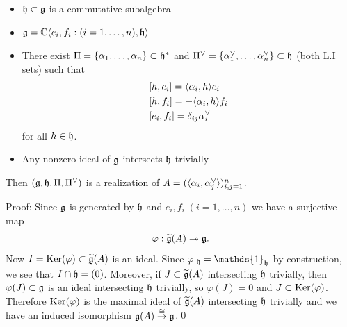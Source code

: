 \begin{itemize}
\begin{dang}
\begin{lemma}
\begin{itemize}
            \item $\mathfrak{h}\subset\mathfrak{g}$ is a commutative subalgebra
            \item $\mathfrak{g} =\mathbb{C}\langle e_i, f_i: (i=1,\dots,n), \mathfrak{h}\rangle$ 
            \item There exist $\Pi = \{\alpha_1,\dots,\alpha_n\}\subset\mathfrak{h}^*$ and 
            $\Pi^\vee=\{\alpha^{\vee}_1,\dots,\alpha^{\vee}_n\}\subset\mathfrak{h}$ (both L.I sets) such that 
            \begin{equation}
                \begin{aligned}
                    &[h,e_i]=\langle\alpha_i,h\rangle e_i\\
                    &[h,f_i]=-\langle\alpha_i,h\rangle f_i\\
                    &[e_i,f_i] = \delta_{ij}\alpha^{\vee}_i
                \end{aligned}
            \end{equation}
            for all $h\in\mathfrak{h}$.
            \item Any nonzero ideal of $\mathfrak{g}$ intersects $\mathfrak{h}$ trivially
        \end{itemize}
        Then $(\mathfrak{g},\mathfrak{h},\Pi,\Pi^\vee)$ is a realization of $A=(\langle\alpha_i,\alpha^{\vee}_j\rangle)_{i,j=1}^n$.
    \end{lemma}
\end{dang}
Proof: Since $\mathfrak{g}$ is generated by $\mathfrak{h}$ and $e_i,f_i\;(i=1,\dots,n)$ we have a surjective map 
\begin{equation}
\varphi:\widetilde{\mathfrak{g}}(A)\twoheadrightarrow \mathfrak{g}.
\end{equation}
Now $I=\text{Ker}(\varphi)\subset \widetilde{\mathfrak{g}}(A)$ is an ideal. Since $\varphi|_{\fr{h}} = \mathds{1}_{\fr{h}}$ by construction, 
we see that $I\cap\mathfrak{h} = (0)$. Moreover, if $J\subset \widetilde{\mathfrak{g}}(A)$ intersecting $\mathfrak{h}$ trivially, then 
$\varphi(J)\subset \mathfrak{g}$ is an ideal intersecting $\mathfrak{h}$ trivially, so $\varphi(J) = 0$ and $J\subset\text{Ker}(\varphi)$. 
Therefore $\text{Ker}(\varphi)$ is the maximal ideal of $\widetilde{\mathfrak{g}}(A)$ intersecting $\mathfrak{h}$ trivially and we have an 
induced isomorphism $\mathfrak{g}(A) \overset{\cong}{\rightarrow}\mathfrak{g}$.\qed


\end{itemize}
